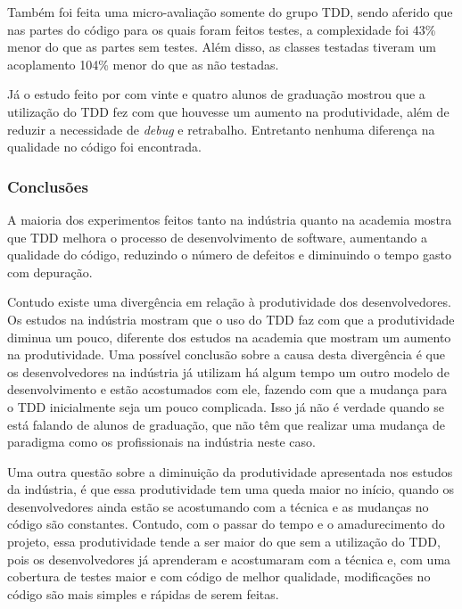 Também foi feita uma micro-avaliação somente do grupo TDD, sendo aferido que nas partes do código para os quais foram feitos testes, a complexidade foi 43\% menor do que as partes sem testes. Além disso, as classes testadas tiveram um acoplamento 104\% menor do que as não testadas.

Já o estudo feito por  com vinte e quatro alunos de graduação mostrou que a utilização do TDD fez com que houvesse um aumento na produtividade, além de reduzir a necessidade de \textit{debug} e retrabalho. Entretanto nenhuma diferença na qualidade no código foi encontrada.


\subsubsection{Conclusões} %
\label{sub:conclusoes}

A maioria dos experimentos feitos tanto na indústria quanto na academia mostra que TDD melhora o processo de desenvolvimento de software, aumentando a qualidade do código, reduzindo o número de defeitos e diminuindo o tempo gasto com depuração.

Contudo existe uma divergência em relação à produtividade dos desenvolvedores. Os estudos na indústria mostram que o uso do TDD faz com que a produtividade diminua um pouco, diferente dos estudos na academia que mostram um aumento na produtividade. Uma possível conclusão sobre a causa desta divergência é que os desenvolvedores na indústria já utilizam há algum tempo um outro modelo de desenvolvimento e estão acostumados com ele, fazendo com que a mudança para o TDD inicialmente seja um pouco complicada. Isso já não é verdade quando se está falando de alunos de graduação, que não têm que realizar uma mudança de paradigma como os profissionais na indústria neste caso.

Uma outra questão sobre a diminuição da produtividade apresentada nos estudos da indústria, é que essa produtividade tem uma queda maior no início, quando os desenvolvedores ainda estão se acostumando com a técnica e as mudanças no código são constantes. Contudo, com o passar do tempo e o amadurecimento do projeto, essa produtividade tende a ser maior do que sem a utilização do TDD, pois os desenvolvedores já aprenderam e acostumaram com a técnica e, com uma cobertura de testes maior e com código de melhor qualidade, modificações no código são mais simples e rápidas de serem feitas.

